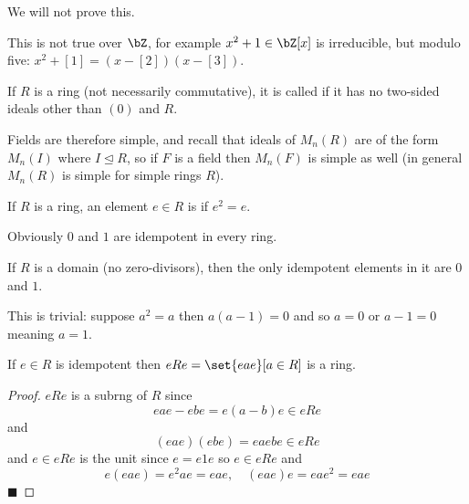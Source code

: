 \documentclass[10pt]{article}
\let\ideal=\trianglelefteq
\def\qed{%
    \ifmmode%
        \eqno\blacksquare%
    \else%
        \hskip1cm\allowbreak\hbox{}\nobreak\hfill$\blacksquare$%
    \fi%
}
\begin{document}
We will not prove this.

This is not true over $\bZ$, for example $x^2+1\in\bZ[x]$ is irreducible, but modulo five: $x^2+[1]=(x-[2])(x-[3])$.

\begin{defn*}

    If $R$ is a ring (not necessarily commutative), it is called  if it has no two-sided ideals other than $(0)$ and $R$.

\end{defn*}

Fields are therefore simple, and recall that ideals of $M_n(R)$ are of the form $M_n(I)$ where $I\ideal R$, so if $F$ is a field then $M_n(F)$ is simple as well (in general $M_n(R)$ is simple for simple
rings $R$).

\begin{defn*}

    If $R$ is a ring, an element $e\in R$ is  if $e^2=e$.

\end{defn*}

Obviously $0$ and $1$ are idempotent in every ring.

\begin{prop*}

    If $R$ is a domain (no zero-divisors), then the only idempotent elements in it are $0$ and $1$.

\end{prop*}

This is trivial: suppose $a^2=a$ then $a(a-1)=0$ and so $a=0$ or $a-1=0$ meaning $a=1$.

\begin{prop*}

    If $e\in R$ is idempotent then $eRe=\set{eae}[a\in R]$ is a ring.

\end{prop*}

\begin{proof}

    $eRe$ is a subrng of $R$ since
    \[ eae - ebe = e(a-b)e \in eRe \]
    and
    \[ (eae)(ebe) = eaebe \in eRe \]
    and $e\in eRe$ is the unit since $e=e1e$ so $e\in eRe$ and
    \[ e(eae) = e^2ae = eae,\quad (eae)e = eae^2 = eae \]
    \qed

\end{proof}
\end{document}
